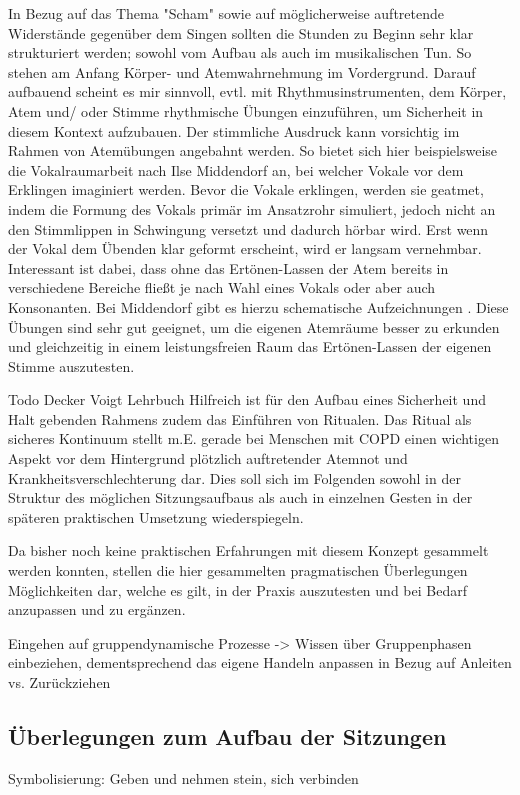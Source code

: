 In Bezug auf das Thema "Scham" sowie auf möglicherweise auftretende Widerstände gegenüber dem Singen sollten die Stunden zu Beginn sehr klar strukturiert werden; sowohl vom Aufbau als auch im musikalischen Tun. So stehen am Anfang Körper- und Atemwahrnehmung im Vordergrund. Darauf aufbauend scheint es mir sinnvoll, evtl. mit Rhythmusinstrumenten, dem Körper, Atem und/ oder Stimme rhythmische Übungen einzuführen, um Sicherheit in diesem Kontext aufzubauen. Der stimmliche Ausdruck kann vorsichtig im Rahmen von Atemübungen angebahnt werden. So bietet sich hier beispielsweise die Vokalraumarbeit nach Ilse Middendorf an, bei welcher Vokale vor dem Erklingen imaginiert werden. Bevor die Vokale erklingen, werden sie geatmet, indem die Formung des Vokals primär im Ansatzrohr simuliert, jedoch nicht an den Stimmlippen in Schwingung versetzt und dadurch hörbar wird. Erst wenn der Vokal dem Übenden klar geformt erscheint, wird er langsam vernehmbar. Interessant ist dabei, dass ohne das Ertönen-Lassen der Atem bereits in verschiedene Bereiche fließt je nach Wahl eines Vokals oder aber auch Konsonanten. Bei Middendorf gibt es hierzu schematische Aufzeichnungen \autocite[vgl.][60ff.]{middendorf1995}. Diese Übungen sind sehr gut geeignet, um die eigenen Atemräume besser zu erkunden und gleichzeitig in einem leistungsfreien Raum das Ertönen-Lassen der eigenen Stimme auszutesten. 

Todo Decker Voigt Lehrbuch Hilfreich ist für den Aufbau eines Sicherheit und Halt gebenden Rahmens zudem das Einführen von Ritualen. Das Ritual als sicheres Kontinuum stellt m.E. gerade bei Menschen mit COPD  einen wichtigen Aspekt vor dem Hintergrund plötzlich auftretender Atemnot und Krankheitsverschlechterung dar. Dies soll sich im Folgenden sowohl in der Struktur des möglichen Sitzungsaufbaus als auch in einzelnen Gesten in der späteren praktischen Umsetzung wiederspiegeln.

Da bisher noch keine praktischen Erfahrungen mit diesem Konzept gesammelt werden konnten, stellen die hier gesammelten pragmatischen Überlegungen Möglichkeiten dar, welche es gilt, in der Praxis auszutesten und bei Bedarf anzupassen und zu ergänzen.

Eingehen auf gruppendynamische Prozesse -> Wissen über Gruppenphasen einbeziehen, dementsprechend das eigene Handeln anpassen in Bezug auf Anleiten vs. Zurückziehen

\subsection{Überlegungen zum Aufbau der Sitzungen}
Symbolisierung: Geben und nehmen stein, sich verbinden

